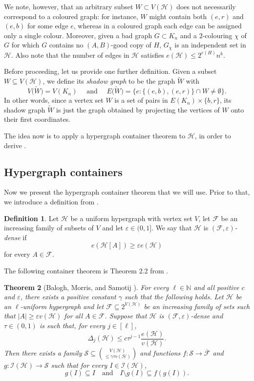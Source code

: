 \documentclass[a4paper,reqno,11pt]{amsart}
\newtheorem{theorem}{Theorem}[section]
\theoremstyle{definition}
\newtheorem{definition}[theorem]{Definition}
\theoremstyle{remark}
\newcommand\cH{\mathcal{H}}
\renewcommand\leq{\leqslant}
\renewcommand\le{\leqslant}
\renewcommand\ge{\geqslant}
\renewcommand\to{\rightarrow}
\begin{document}
We note, however, that an arbitrary subset $W \subset V(\cH)$ does not necessarily correspond to a coloured graph: for instance, $W$ might contain both $(e,r)$ and $(e,b)$ for some edge $e$, whereas in a coloured graph each edge can be assigned only a single colour. Moreover, given a bad graph $G \subset K_n$ and a $2$-colouring $\chi$ of $G$ for which $G$ contains no $(A,B)$-good copy of $H$, $G_\chi$ is an independent set in $\cH$. Also note that the number of edges in $\cH$ satisfies $e(\cH)\leq 2^{e(H)}n^{k}$.

Before proceeding, let us provide one further definition. Given a subset $W \subseteq V(\cH)$, we define its \textit{shadow graph} to be the graph $\widetilde{W}$ with
\[V\big(\widetilde{W}\big)=V(K_n)\quad\text{ and }\quad E\big(\widetilde{W}\big)=\big\{e\colon \{(e,b),(e,r)\} \cap W \neq \emptyset\big\}.\]
In other words, since a vertex set $W$ is a set of pairs in $E(K_n) \times \{b,r\}$, its shadow graph $\widetilde{W}$ is just the graph obtained by projecting the vertices of $W$ onto their first coordinates.

The idea now is to apply a hypergraph container theorem to $\cH$, in order to derive .

\subsection{Hypergraph containers}\label{subsec:HC} Now we present the hypergraph container theorem that we will use. Prior to that, we introduce a definition from \cite{BMS}.

\begin{definition}
Let $\mathcal{H}$ be a uniform hypergraph with vertex set $V$, 
let $\mathcal{F}$ be an increasing family of subsets of $V$ 
and let $\varepsilon \in (0,1]$. 
We say that $\mathcal{H}$ is $(\mathcal{F}, \varepsilon)$\emph{-dense} if
\[e(\mathcal{H}[A]) \ge \varepsilon e(\mathcal{H})\]
for every $A \in \mathcal{F}$.
\end{definition}

The following container theorem is Theorem 2.2 from \cite{BMS}.

\begin{theorem}[Balogh, Morris, and Samotij \cite{BMS}]\label{thm:BMS}
For every $\ell \in \mathbb{N}$ and all positive $c$ and $\varepsilon$, there exists a positive constant $\gamma$ such that the following holds. 
Let $\mathcal{H}$ be an $\ell$-uniform hypergraph and let $\mathcal{F} \subseteq 2^{V(\mathcal{H})}$ be an increasing family of sets such that 
$|A| \ge \varepsilon v(\mathcal{H})$ for all $A \in \mathcal{F}$. 
Suppose that $\mathcal{H}$ is $(\mathcal{F}, \varepsilon)$-dense and $\tau \in (0,1)$ is such that, for every $j \in [\ell]$,
\[\Delta_j(\mathcal{H}) \le c\tau^{j-1} \frac{e(\mathcal{H})}{v(\mathcal{H})}.\]
Then there exists a family $\mathcal{S} \subseteq \binom{V(\mathcal{H})}{\le \gamma \tau v(\mathcal{H})}$ and functions $f \colon \mathcal{S} \to \overline{\mathcal{F}}$ and 
$g \colon \mathcal{I}(\mathcal{H}) \to \mathcal{S}$ such that for every $I \in \mathcal{I}(\mathcal{H})$,
\[g(I) \subseteq I \quad \text{and} \quad I \setminus g(I) \subseteq f(g(I)).\]
\end{theorem}
\end{document}
